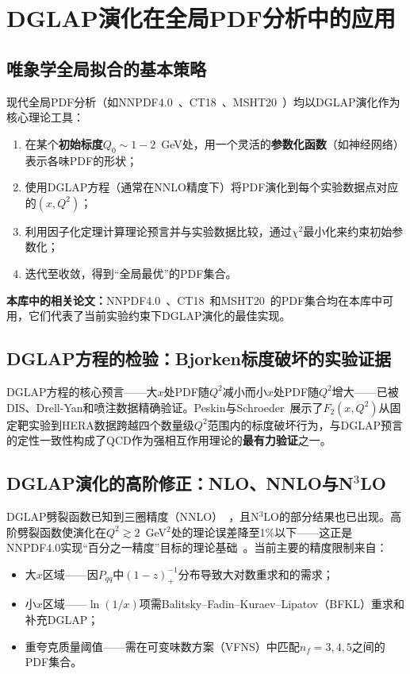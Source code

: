\documentclass[12pt,a4paper]{ctexart}
\theoremstyle{definition}
\begin{document}
\section{DGLAP演化在全局PDF分析中的应用}

\subsection{唯象学全局拟合的基本策略}

现代全局PDF分析（如NNPDF4.0~\cite{NNPDF2021}、CT18~\cite{Hou2021CT18}、MSHT20~\cite{Bailey2021MSHT20}）均以DGLAP演化作为核心理论工具：

\begin{enumerate}[leftmargin=*]
    \item 在某个\textbf{初始标度}$Q_0 \sim 1-2$~GeV处，用一个灵活的\textbf{参数化函数}（如神经网络）表示各味PDF的形状；
    \item 使用DGLAP方程（通常在NNLO精度下）将PDF演化到每个实验数据点对应的$(x, Q^2)$；
    \item 利用因子化定理计算理论预言并与实验数据比较，通过$\chi^2$最小化来约束初始参数化；
    \item 迭代至收敛，得到``全局最优''的PDF集合。
\end{enumerate}

\textbf{本库中的相关论文：}NNPDF4.0~\cite{NNPDF2021}、CT18~\cite{Hou2021CT18}和MSHT20~\cite{Bailey2021MSHT20}的PDF集合均在本库中可用，它们代表了当前实验约束下DGLAP演化的最佳实现。

\subsection{DGLAP方程的检验：Bjorken标度破坏的实验证据}

DGLAP方程的核心预言——大$x$处PDF随$Q^2$减小而小$x$处PDF随$Q^2$增大——已被DIS、Drell-Yan和喷注数据精确验证。Peskin与Schroeder~\cite{PeskinSchroeder1995}展示了$F_2(x, Q^2)$从固定靶实验到HERA数据跨越四个数量级$Q^2$范围内的标度破坏行为，与DGLAP预言的定性一致性构成了QCD作为强相互作用理论的\textbf{最有力验证}之一。

\subsection{DGLAP演化的高阶修正：NLO、NNLO与N$^3$LO}

DGLAP劈裂函数已知到三圈精度（NNLO）~\cite{Moch2004splitting,Vogt2004splitting}，且N$^3$LO的部分结果也已出现。高阶劈裂函数使演化在$Q^2 \gtrsim 2$~GeV$^2$处的理论误差降至1\%以下——这正是NNPDF4.0实现``百分之一精度''目标的理论基础~\cite{NNPDF2021}。当前主要的精度限制来自：
\begin{itemize}
    \item 大$x$区域——因$P_{qq}$中$(1-z)_+^{-1}$分布导致大对数重求和的需求；
    \item 小$x$区域——$\ln(1/x)$项需Balitsky--Fadin--Kuraev--Lipatov（BFKL）重求和补充DGLAP；
    \item 重夸克质量阈值——需在可变味数方案（VFNS）中匹配$n_f=3,4,5$之间的PDF集合。
\end{itemize}
\end{document}

